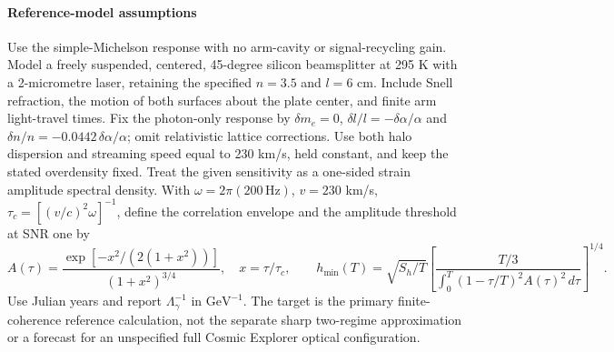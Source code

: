 \paragraph*{Reference-model assumptions}
Use the simple-Michelson response with no arm-cavity or signal-recycling gain.
Model a freely suspended, centered, 45-degree silicon beamsplitter at 295 K
with a 2-micrometre laser, retaining the specified $n=3.5$ and $l=6$ cm.
Include Snell refraction, the motion of both surfaces about the plate center,
and finite arm light-travel times. Fix the photon-only response by
$\delta m_e=0$, $\delta l/l=-\delta\alpha/\alpha$ and
$\delta n/n=-0.0442\,\delta\alpha/\alpha$; omit relativistic lattice corrections.
Use both halo dispersion and streaming speed equal to 230 km/s, held constant,
and keep the stated overdensity fixed. Treat the given sensitivity as a
one-sided strain amplitude spectral density. With $\omega=2\pi(200\,\mathrm{Hz})$,
$v=230$ km/s, $\tau_c=[(v/c)^2\omega]^{-1}$, define the correlation envelope
and the amplitude threshold at SNR one by
\[
A(\tau)=\frac{\exp[-x^2/(2(1+x^2))]}{(1+x^2)^{3/4}},\quad x=\tau/\tau_c,
\qquad h_{\min}(T)=\sqrt{S_h/T}\left[
\frac{T/3}{\int_0^T(1-\tau/T)^2A(\tau)^2\,d\tau}\right]^{1/4}.
\]
Use Julian years and report $\Lambda_\gamma^{-1}$ in $\mathrm{GeV}^{-1}$.
The target is the primary finite-coherence reference calculation, not the
separate sharp two-regime approximation or a forecast for an unspecified
full Cosmic Explorer optical configuration.
